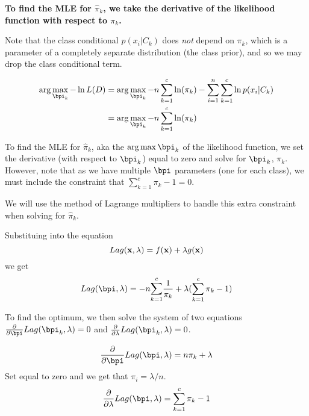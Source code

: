 \documentclass[submit]{harvardml}
\newenvironment{answer}{%
    \color{answergreen}\bf}
  {%
  }
\begin{document}
\begin{enumerate}
\begin{answer}
        To find the MLE for $\hat \pi_k$, we take the derivative of the
        likelihood function with respect to $\pi_k$. 
        
        Note that the class conditional $p(x_i | C_k)$ does \textit{not} depend on
        $\pi_k$, which is a parameter of a completely separate distribution (the
        class prior), and so we may drop the class conditional term.

        \begin{align*}
            \arg\max_{\bpi_k} 
            -\ln L(D) 
            &= \arg\max_{\bpi_k} 
                - n \sum_{k=1}^c \ln(\pi_k) - \sum_{i=1}^n \sum_{k=1}^c \ln p(x_i|C_k) \\
            &= \arg\max_{\bpi_k} - n \sum_{k=1}^c \ln(\pi_k) 
        \end{align*}

        To find the MLE for $\hat \pi_k$, aka the $\arg\max{\bpi_k}$ of the
        likelihood function, we set the derivative (with respect to
        $\bpi_k$) equal to zero and solve for $\bpi_k$, $\pi_k$. However, note
        that as we have multiple $\bpi$ parameters (one for each class), we must
        include the constraint that $\sum_{k=1}^c \pi_k-1=0$.

        We will use the method of Lagrange multipliers to handle this extra
        constraint when solving for $\hat \pi_k$.
            
        Substituing into the equation 
        $$
        Lag(\mathbf{x},\lambda) = f(\mathbf{x})+\lambda g(\mathbf{x}) \\
        $$
        we get
        $$
        Lag(\bpi,\lambda) 
            = -n \lsum_{k=1}^c  \frac{1}{\pi_k} + \lambda( \sum_{k=1}^c\pi_k-1)
        $$

        To find the optimum, we then solve the system of two equations 
        $\frac{\partial}{\partial \bpi} Lag(\bpi_k,\lambda)=0$ and
        $\frac{\partial}{\partial\lambda} Lag(\bpi_k, \lambda)= 0$.
        
        $$
        \frac{\partial}{
            \partial \bpi} Lag(\bpi,\lambda) = n \pi_k + \lambda
        $$
        Set equal to zero and we get that $\pi_i =  \lambda / n$.
        $$
        \frac{\partial}{
            \partial \lambda} Lag(\bpi,\lambda) = \sum_{k=1}^c\pi_k-1
        $$


    \end{answer}


\end{enumerate}
\end{document}
